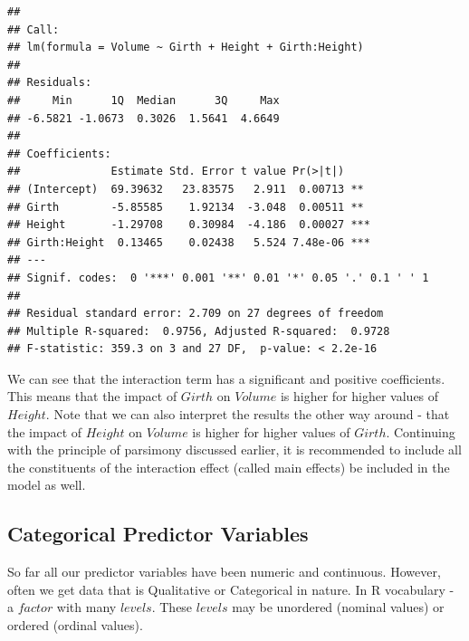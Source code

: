 \documentclass[11pt, letterpaper, twoside]{memoir}\usepackage{knitr}
\begin{document}
\begin{knitrout}
\color{fgcolor}\begin{kframe}
\begin{alltt}
 \hlkwb{<-}  \hlopt{~}  \hlopt{+}  \hlopt{+} \hlopt{:}
\end{alltt}
\begin{verbatim}
## 
## Call:
## lm(formula = Volume ~ Girth + Height + Girth:Height)
## 
## Residuals:
##     Min      1Q  Median      3Q     Max 
## -6.5821 -1.0673  0.3026  1.5641  4.6649 
## 
## Coefficients:
##              Estimate Std. Error t value Pr(>|t|)    
## (Intercept)  69.39632   23.83575   2.911  0.00713 ** 
## Girth        -5.85585    1.92134  -3.048  0.00511 ** 
## Height       -1.29708    0.30984  -4.186  0.00027 ***
## Girth:Height  0.13465    0.02438   5.524 7.48e-06 ***
## ---
## Signif. codes:  0 '***' 0.001 '**' 0.01 '*' 0.05 '.' 0.1 ' ' 1
## 
## Residual standard error: 2.709 on 27 degrees of freedom
## Multiple R-squared:  0.9756,	Adjusted R-squared:  0.9728 
## F-statistic: 359.3 on 3 and 27 DF,  p-value: < 2.2e-16
\end{verbatim}
\end{kframe}
\end{knitrout}

We can see that the interaction term has a significant and positive coefficients. This means that the impact of $Girth$ on $Volume$ is higher for higher values of $Height$. Note that we can also interpret the results the other way around - that the impact of $Height$ on $Volume$ is higher for higher values of $Girth$. Continuing with the principle of parsimony discussed earlier, it is recommended to include all the constituents of the interaction effect (called main effects) be included in the model as well.

\subsection{Categorical Predictor Variables}

So far all our predictor variables have been numeric and continuous. However, often we get data that is Qualitative or Categorical in nature. In R vocabulary - a $factor$ with many $levels$. These $levels$ may be unordered (nominal values) or ordered (ordinal values).
\end{document}
